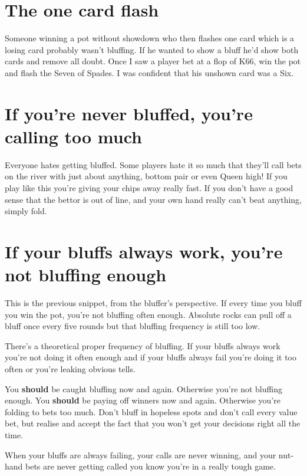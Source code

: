 \section{The one card flash}

Someone winning a pot without showdown who then flashes one card
which is a losing card probably wasn't bluffing. If he wanted to
show a bluff he'd show both cards and remove all doubt. Once
I saw a player bet at a flop of K66, win the pot and flash the
Seven of Spades. I was confident that his unshown card was a
Six.

\section{If you're never bluffed, you're calling too much}

Everyone hates getting bluffed. Some players hate it so much that
they'll call bets on the river with just about anything, bottom pair
or even Queen high! If you play like this you're giving your chips
away really fast. If you don't have a good sense that the bettor is
out of line, and your own hand really can't beat anything, simply fold.

\section{If your bluffs always work, you're not bluffing enough}

This is the previous snippet, from the bluffer's perspective. If every
time you bluff you win the pot, you're not bluffing often enough.
Absolute rocks can pull off a bluff once every five rounds but
that bluffing frequency is still too low.

There's a theoretical proper frequency of bluffing. If your bluffs
always work you're not doing it often enough and if your bluffs always
fail you're doing it too often or you're leaking obvious tells.

You \textbf{should} be caught bluffing now and again.
Otherwise you're not bluffing enough. You
\textbf{should} be paying off winners now and again.
Otherwise you're folding to bets too much.
Don't bluff in hopeless spots and don't call every value bet, but
realise and accept the fact that you won't get your decisions right
all the time.

When your bluffs are always failing, your calls are never winning,
and your nut-hand bets are never getting called
you know you're in a really tough game.

